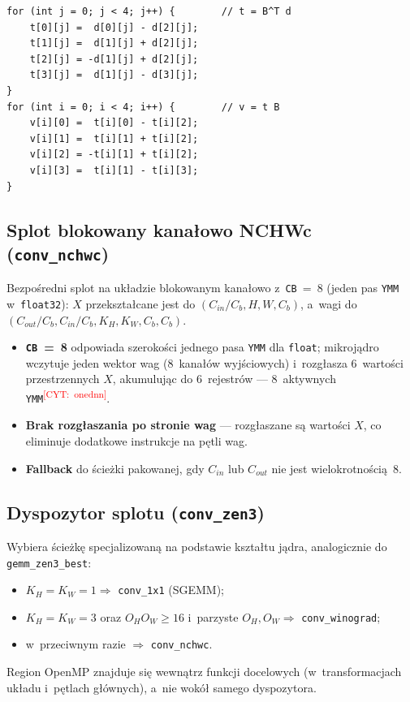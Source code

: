 \documentclass[a4paper,12pt]{book} %
\newcommand{\todocite}[1]{\textsuperscript{\textcolor{red}{[CYT:~#1]}}}
\newcommand{\kod}[1]{\texttt{#1}}
\begin{document}
\begin{lstfloat}[htbp]
\lstset{language=C}
\begin{lstlisting}[caption={Transformacja wejścia Winograda $v=B^{\mathsf T} d\,B$ rozpisana na dodawania (\kod{conv\_winograd.c}).}, label={lst:winograd}]
for (int j = 0; j < 4; j++) {        // t = B^T d
    t[0][j] =  d[0][j] - d[2][j];
    t[1][j] =  d[1][j] + d[2][j];
    t[2][j] = -d[1][j] + d[2][j];
    t[3][j] =  d[1][j] - d[3][j];
}
for (int i = 0; i < 4; i++) {        // v = t B
    v[i][0] =  t[i][0] - t[i][2];
    v[i][1] =  t[i][1] + t[i][2];
    v[i][2] = -t[i][1] + t[i][2];
    v[i][3] =  t[i][1] - t[i][3];
}
\end{lstlisting}
\end{lstfloat}

\subsection{Splot blokowany kanałowo NCHWc (\kod{conv\_nchwc})}
Bezpośredni splot na układzie blokowanym kanałowo z~\kod{CB}~=~8 (jeden pas
\kod{YMM} w~\kod{float32}): $X$ przekształcane jest do
$(C_{in}/C_b,H,W,C_b)$, a~wagi do $(C_{out}/C_b,C_{in}/C_b,K_H,K_W,C_b,C_b)$.
\begin{itemize}
\item \textbf{\kod{CB}~=~8} odpowiada szerokości jednego pasa \kod{YMM} dla
  \kod{float}; mikrojądro wczytuje jeden wektor wag (8~kanałów wyjściowych) i~rozgłasza
  6~wartości przestrzennych $X$, akumulując do 6~rejestrów --- 8~aktywnych
  \kod{YMM}\todocite{onednn}.
\item \textbf{Brak rozgłaszania po stronie wag} --- rozgłaszane są wartości $X$,
  co eliminuje dodatkowe instrukcje na pętli wag.
\item \textbf{Fallback} do ścieżki pakowanej, gdy $C_{in}$ lub $C_{out}$ nie jest
  wielokrotnością~8.
\end{itemize}

\subsection{Dyspozytor splotu (\kod{conv\_zen3})}
Wybiera ścieżkę specjalizowaną na podstawie kształtu jądra, analogicznie do
\kod{gemm\_zen3\_best}:
\begin{itemize}
\item $K_H=K_W=1 \Rightarrow$ \kod{conv\_1x1} (SGEMM);
\item $K_H=K_W=3$ oraz $O_H O_W\ge16$ i~parzyste $O_H,O_W \Rightarrow$
  \kod{conv\_winograd};
\item w~przeciwnym razie $\Rightarrow$ \kod{conv\_nchwc}.
\end{itemize}
Region OpenMP znajduje się wewnątrz funkcji docelowych (w~transformacjach układu
i~pętlach głównych), a~nie wokół samego dyspozytora.
\end{document}
